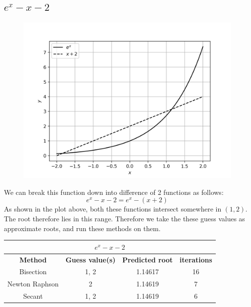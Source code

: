 \documentclass[12,a4paper]{article}
\begin{document}
    \subsection{$e^x - x - 2$}
    \begin{figure}[H]
        \centering
        \includegraphics[width = \textwidth]{plots/p8.png}
        \label{fig:my_label}
    \end{figure}
    We can break this function down into difference of 2 functions as follows:
    \begin{equation}
        e^x-x-2 = e^x - (x+2)
    \end{equation}
    As shown in the plot above, both these functions intersect somewhere in $(1,2)$. The root therefore lies in this range. Therefore we take the these guess values as approximate roots, and run these methods on them.
    \begin{table}[h!]
        \centering
        \begin{tabular}{|c|c c c|} 
            \hline
            \multicolumn{4}{|c|}{$e^x - x - 2$}\\
            \hline
            \textbf{Method}&\textbf{Guess value(s)}&\textbf{Predicted root}&\textbf{iterations} \\ [0.5ex] 
            \hline
            Bisection & 1, 2 & 1.14617 & 16 \\ 
            Newton Raphson & 2 & 1.14619 & 7 \\
            Secant &  1, 2 & 1.14619 & 6 \\[1ex] 
            \hline
        \end{tabular}
    \end{table}
    
\end{document}
